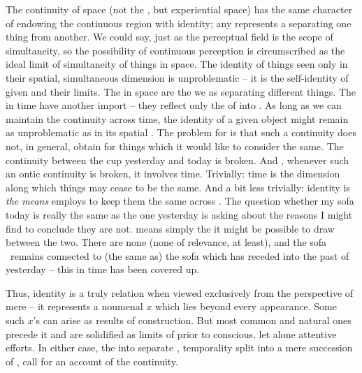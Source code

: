 The continuity of space (not the , but experiential space) has the
same character of endowing the continuous region with identity; any 
represents a  separating one thing from another. We could say,
just as the perceptual field is the scope of simultaneity, so the possibility of
continuous perception is circumscribed as the ideal limit of simultaneity of
 things in space. The identity of things seen only in their
spatial, simultaneous dimension is unproblematic -- it is the self-identity of
 given  and their limits. The  in
space are the  we  as separating different things. The
 in time have another import -- they reflect only the
 of  into .  As long as we can
maintain the continuity across time, the identity of a given object might remain
as unproblematic as in its spatial .  The problem for
 is that such a continuity does not, in general, obtain for
things which it would like to consider the same. The continuity between the cup
yesterday and today is broken. And , whenever such an ontic
continuity is broken, it involves time.  Trivially: time is the dimension along
which things may cease to be the same. And a bit less trivially: identity is
{\em the means}  employs to keep them the same across
. The question whether my sofa today is really the
same as the one yesterday is asking about the reasons I might find to conclude
they are not.  means simply the 
it might be possible to draw between the two. There are none (none of relevance,
at least), and the sofa
\herenow\ remains connected to (the same as) the sofa which has receded into the
past  of yesterday -- this  in time has been covered up.


\pa
Thus, identity is a truly  relation when viewed exclusively
from the perspective of mere  -- it represents a noumenal $x$
which lies beyond every  appearance. Some such
$x$'s can arise as results of 
 construction. But most common and natural ones precede it and
are solidified as limits of  prior to conscious, let alone 
attentive efforts.  In either case, the  into
separate , temporality split into a mere succession of
, call for an account of the  continuity.

